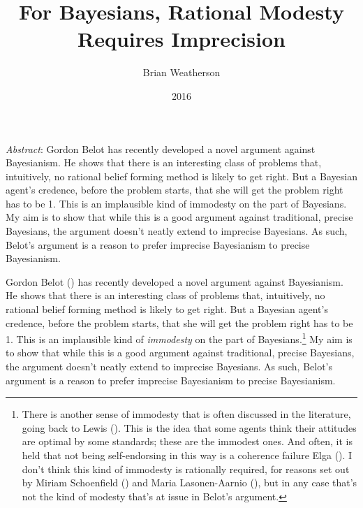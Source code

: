 \documentclass[
  11pt,
  letterpaper,
  DIV=11,
  numbers=noendperiod,
  twoside]{scrartcl}
\title{For Bayesians, Rational Modesty Requires Imprecision}
\author{Brian Weatherson}
\date{2016}
\renewenvironment{abstract}
 {\vspace{-1.25cm}
 \quotation\small\noindent\emph{Abstract}:}
 {\endquotation}
\begin{document}
\maketitle
\begin{abstract}
Gordon Belot has recently developed a novel argument against
Bayesianism. He shows that there is an interesting class of problems
that, intuitively, no rational belief forming method is likely to get
right. But a Bayesian agent's credence, before the problem starts, that
she will get the problem right has to be 1. This is an implausible kind
of immodesty on the part of Bayesians. My aim is to show that while this
is a good argument against traditional, precise Bayesians, the argument
doesn't neatly extend to imprecise Bayesians. As such, Belot's argument
is a reason to prefer imprecise Bayesianism to precise Bayesianism.
\end{abstract}


Gordon Belot () has recently developed a
novel argument against Bayesianism. He shows that there is an
interesting class of problems that, intuitively, no rational belief
forming method is likely to get right. But a Bayesian agent's credence,
before the problem starts, that she will get the problem right has to be
1. This is an implausible kind of \emph{immodesty} on the part of
Bayesians.\footnote{There is another sense of immodesty that is often
  discussed in the literature, going back to Lewis
  (). This is the idea that some agents
  think their attitudes are optimal by some standards; these are the
  immodest ones. And often, it is held that not being self-endorsing in
  this way is a coherence failure Elga
  (). I don't think this kind of
  immodesty is rationally required, for reasons set out by Miriam
  Schoenfield () and Maria
  Lasonen-Aarnio (), but in any
  case that's not the kind of modesty that's at issue in Belot's
  argument.} My aim is to show that while this is a good argument
against traditional, precise Bayesians, the argument doesn't neatly
extend to imprecise Bayesians. As such, Belot's argument is a reason to
prefer imprecise Bayesianism to precise Bayesianism.
\end{document}

